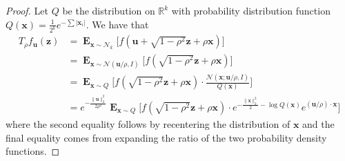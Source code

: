 \documentclass{theoretics}
\newcommand\twonorm[1]{\|#1\|_2}
\renewcommand\vec[1]{\mathbf{#1}}
\DeclareMathOperator*{\E}{\mathbf{E}}
\newcommand{\R}{\mathbb{R}}
\newcommand{\1}{\Ind}
\newcommand{\x}{\vec x}
\newcommand{\vu}{\vec u}
\newcommand{\z}{\vec z}
\newcommand{\Gauss}{\mathcal{N}}
\begin{document}
\begin{proof}
    Let $Q$ be the distribution on $\R^k$ with probability distribution function $Q(\x)=\frac{1}{2^k}e^{-\sum{|\x_i|}}$. We have that 
    \begin{align*}
        T_{\rho}f_{\vu}(\z)&=\E_{\x\sim \Gauss_k}\bigl[f(\vu+\sqrt{1-\rho^2}\z+\rho\x)\bigr]\\
        &=\E_{\x\sim \Gauss(\vu/\rho,I)}\bigl[f(\sqrt{1-\rho^2}\z+\rho\x)\bigr]\\
        &=\E_{\x\sim Q}\biggl[f(\sqrt{1-\rho^2}\z+\rho\x)\cdot \frac{\Gauss(\x;\vu/\rho,I)}{Q(\x)}\biggr]\\
        &=e^{-\frac{\twonorm{\vu}^2}{2\rho^2}}\E_{\x\sim Q}\biggl[f(\sqrt{1-\rho^2}\z+\rho\x)\cdot e^{-\frac{\twonorm{\x}^2}{2}-\log Q(\x)}e^{ (\vu/\rho)\cdot\x}\biggr]
    \end{align*}
    where the second equality follows by recentering the distribution of $\x$ and the final equality comes from expanding the ratio of the two probability density functions. 
    

\end{proof}
\end{document}
